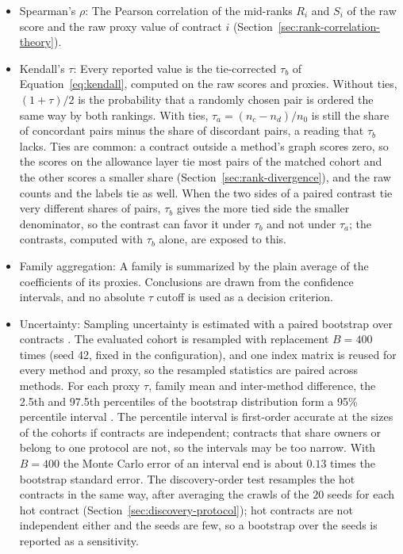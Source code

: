 \begin{itemize}
\item Spearman's $\rho$: The Pearson correlation of the mid-ranks $R_i$ and $S_i$ of the raw score and the raw proxy value of contract $i$ (Section~\ref{sec:rank-correlation-theory}).

\item Kendall's $\tau$: Every reported value is the tie-corrected $\tau_b$ of Equation~\eqref{eq:kendall}, computed on the raw scores and proxies. Without ties, $(1+\tau)/2$ is the probability that a randomly chosen pair is ordered the same way by both rankings. With ties, $\tau_a=(n_c-n_d)/n_0$ is still the share of concordant pairs minus the share of discordant pairs, a reading that $\tau_b$ lacks. Ties are common: a contract outside a method's graph scores zero, so the scores on the allowance layer tie most pairs of the matched cohort and the other scores a smaller share (Section~\ref{sec:rank-divergence}), and the raw counts and the labels tie as well. When the two sides of a paired contrast tie very different shares of pairs, $\tau_b$ gives the more tied side the smaller denominator, so the contrast can favor it under $\tau_b$ and not under $\tau_a$; the contrasts, computed with $\tau_b$ alone, are exposed to this.

\item Family aggregation: A family is summarized by the plain average of the coefficients of its proxies. Conclusions are drawn from the confidence intervals, and no absolute $\tau$ cutoff is used as a decision criterion.

\item Uncertainty: Sampling uncertainty is estimated with a paired bootstrap over contracts \parencite{efron1979bootstrap}. The evaluated cohort is resampled with replacement $B=400$ times (seed 42, fixed in the configuration), and one index matrix is reused for every method and proxy, so the resampled statistics are paired across methods. For each proxy $\tau$, family mean and inter-method difference, the 2.5th and 97.5th percentiles of the bootstrap distribution form a 95\% percentile interval \parencite{diciccio1996bootstrap}. The percentile interval is first-order accurate at the sizes of the cohorts if contracts are independent; contracts that share owners or belong to one protocol are not, so the intervals may be too narrow. With $B=400$ the Monte Carlo error of an interval end is about $0.13$ times the bootstrap standard error. The discovery-order test resamples the hot contracts in the same way, after averaging the crawls of the $20$ seeds for each hot contract (Section~\ref{sec:discovery-protocol}); hot contracts are not independent either and the seeds are few, so a bootstrap over the seeds is reported as a sensitivity.


\end{itemize}
